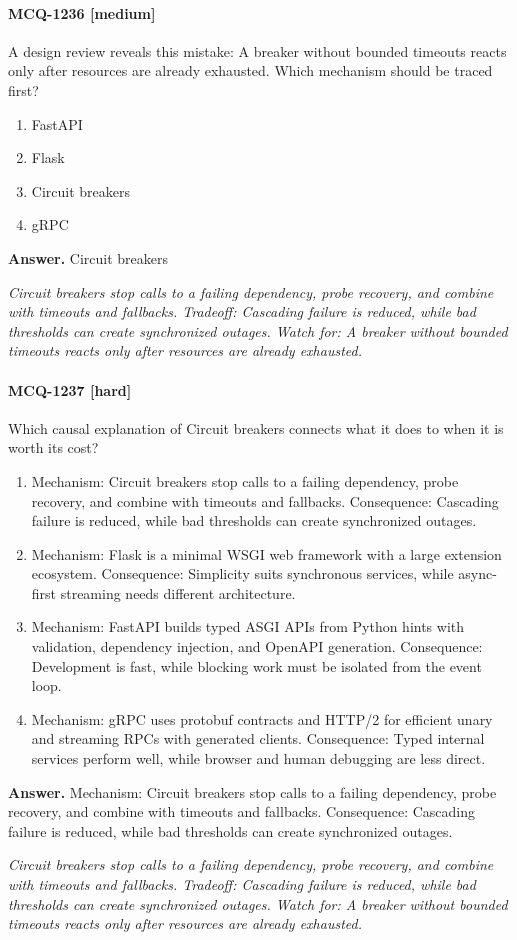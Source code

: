 \paragraph{MCQ-1236 [medium]} A design review reveals this mistake: A breaker without bounded timeouts reacts only after resources are already exhausted. Which mechanism should be traced first?
\begin{enumerate}[label=\Alph*.]
\item FastAPI
\item Flask
\item Circuit breakers
\item gRPC
\end{enumerate}
\noindent\textbf{Answer.} Circuit breakers
\par\textit{Circuit breakers stop calls to a failing dependency, probe recovery, and combine with timeouts and fallbacks. Tradeoff: Cascading failure is reduced, while bad thresholds can create synchronized outages. Watch for: A breaker without bounded timeouts reacts only after resources are already exhausted.}
\paragraph{MCQ-1237 [hard]} Which causal explanation of Circuit breakers connects what it does to when it is worth its cost?
\begin{enumerate}[label=\Alph*.]
\item Mechanism: Circuit breakers stop calls to a failing dependency, probe recovery, and combine with timeouts and fallbacks. Consequence: Cascading failure is reduced, while bad thresholds can create synchronized outages.
\item Mechanism: Flask is a minimal WSGI web framework with a large extension ecosystem. Consequence: Simplicity suits synchronous services, while async-first streaming needs different architecture.
\item Mechanism: FastAPI builds typed ASGI APIs from Python hints with validation, dependency injection, and OpenAPI generation. Consequence: Development is fast, while blocking work must be isolated from the event loop.
\item Mechanism: gRPC uses protobuf contracts and HTTP/2 for efficient unary and streaming RPCs with generated clients. Consequence: Typed internal services perform well, while browser and human debugging are less direct.
\end{enumerate}
\noindent\textbf{Answer.} Mechanism: Circuit breakers stop calls to a failing dependency, probe recovery, and combine with timeouts and fallbacks. Consequence: Cascading failure is reduced, while bad thresholds can create synchronized outages.
\par\textit{Circuit breakers stop calls to a failing dependency, probe recovery, and combine with timeouts and fallbacks. Tradeoff: Cascading failure is reduced, while bad thresholds can create synchronized outages. Watch for: A breaker without bounded timeouts reacts only after resources are already exhausted.}
